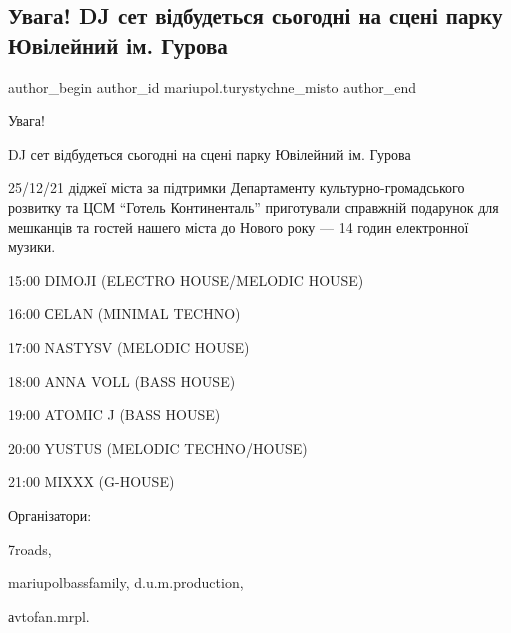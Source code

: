 
 
 
 
 

\subsection{Увага! DJ сет відбудеться сьогодні на сцені парку Ювілейний ім. Гурова}
\label{sec:25_12_2021.fb.mariupol.turystychne_misto.3.uvaga_dj_set_park_gurova}

\ifcmt
 author_begin
   author_id mariupol.turystychne_misto
 author_end
\fi

Увага! 

DJ сет відбудеться сьогодні на сцені парку Ювілейний ім. Гурова 

25/12/21 діджеї міста за підтримки Департаменту культурно-громадського розвитку
та ЦСМ \enquote{Готель Континенталь} приготували справжній подарунок для мешканців та
гостей нашего міста до Нового року — 14 годин електронної музики.

15:00 DIMOJI (ELECTRO HOUSE/MELODIC HOUSE)\par
16:00 СELAN (MINIMAL TECHNO)\par
17:00 NASTYSV (MELODIC HOUSE)\par
18:00 ANNA VOLL (BASS HOUSE)\par
19:00 ATOMIC J (BASS HOUSE)\par
20:00 YUSTUS (MELODIC TECHNO/HOUSE)\par
21:00 MIXXX (G-HOUSE)\par

Організатори: 

7roads, 

mariupolbassfamily, d.u.m.production, 

аvtofan.mrpl.
